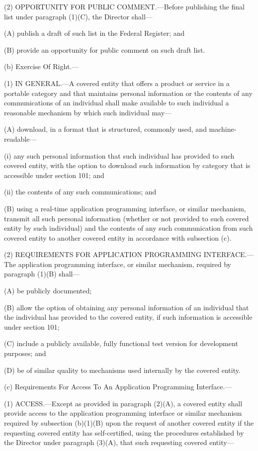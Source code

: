 (2) OPPORTUNITY FOR PUBLIC COMMENT.—Before publishing the final list under paragraph (1)(C), the Director shall—

(A) publish a draft of such list in the Federal Register; and

(B) provide an opportunity for public comment on such draft list.

(b) Exercise Of Right.—

(1) IN GENERAL.—A covered entity that offers a product or service in a portable category and that maintains personal information or the contents of any communications of an individual shall make available to such individual a reasonable mechanism by which such individual may—

(A) download, in a format that is structured, commonly used, and machine-readable—

(i) any such personal information that such individual has provided to such covered entity, with the option to download such information by category that is accessible under section 101; and

(ii) the contents of any such communications; and

(B) using a real-time application programming interface, or similar mechanism, transmit all such personal information (whether or not provided to such covered entity by such individual) and the contents of any such communication from such covered entity to another covered entity in accordance with subsection (c).

(2) REQUIREMENTS FOR APPLICATION PROGRAMMING INTERFACE.—The application programming interface, or similar mechanism, required by paragraph (1)(B) shall—

(A) be publicly documented;

(B) allow the option of obtaining any personal information of an individual that the individual has provided to the covered entity, if such information is accessible under section 101;

(C) include a publicly available, fully functional test version for development purposes; and

(D) be of similar quality to mechanisms used internally by the covered entity.

(c) Requirements For Access To An Application Programming Interface.—

(1) ACCESS.—Except as provided in paragraph (2)(A), a covered entity shall provide access to the application programming interface or similar mechanism required by subsection (b)(1)(B) upon the request of another covered entity if the requesting covered entity has self-certified, using the procedures established by the Director under paragraph (3)(A), that such requesting covered entity—

